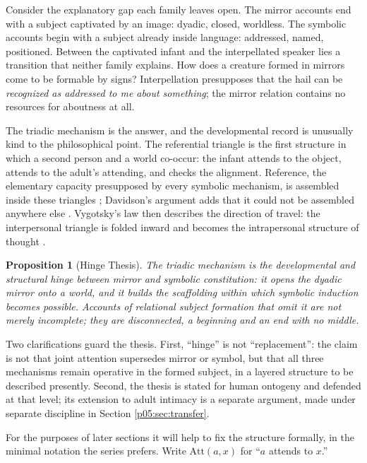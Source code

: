 \documentclass[11pt,a4paper]{article}
\theoremstyle{seriesthm}
\newtheorem{prop}{Proposition}
\begin{document}
Consider the explanatory gap each family leaves open. The mirror accounts end with a subject captivated by an image: dyadic, closed, worldless. The symbolic accounts begin with a subject already inside language: addressed, named, positioned. Between the captivated infant and the interpellated speaker lies a transition that neither family explains. How does a creature formed in mirrors come to be formable by signs? Interpellation presupposes that the hail can be \emph{recognized as addressed to me about something}; the mirror relation contains no resources for aboutness at all.

The triadic mechanism is the answer, and the developmental record is unusually kind to the philosophical point. The referential triangle is the first structure in which a second person and a world co-occur: the infant attends to the object, attends to the adult's attending, and checks the alignment. Reference, the elementary capacity presupposed by every symbolic mechanism, is assembled inside these triangles \parencite{bruner1983}; Davidson's argument adds that it could not be assembled anywhere else \parencite{davidson2001}. Vygotsky's law then describes the direction of travel: the interpersonal triangle is folded inward and becomes the intrapersonal structure of thought \parencite{vygotsky1978}.

\begin{prop}[Hinge Thesis]\label{p05:prop:hinge}
The triadic mechanism is the developmental and structural hinge between mirror and symbolic constitution: it opens the dyadic mirror onto a world, and it builds the scaffolding within which symbolic induction becomes possible. Accounts of relational subject formation that omit it are not merely incomplete; they are disconnected, a beginning and an end with no middle.
\end{prop}

Two clarifications guard the thesis. First, ``hinge'' is not ``replacement'': the claim is not that joint attention supersedes mirror or symbol, but that all three mechanisms remain operative in the formed subject, in a layered structure to be described presently. Second, the thesis is stated for human ontogeny and defended at that level; its extension to adult intimacy is a separate argument, made under separate discipline in Section \ref{p05:sec:transfer}.

For the purposes of later sections it will help to fix the structure formally, in the minimal notation the series prefers. Write $\mathrm{Att}(a,x)$ for ``$a$ attends to $x$.''
\end{document}
